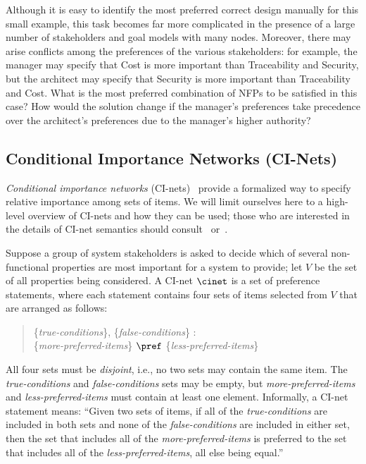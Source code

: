 Although it is easy to identify the most preferred correct design manually for this small example, this
task becomes far more complicated in the presence of a large number of stakeholders and goal models
with many nodes. Moreover, there may arise conflicts among the preferences of the various stakeholders: 
for example, the manager may specify that Cost is more important than Traceability and Security, but
the architect may specify that Security is more important than Traceability and Cost. What is the most
preferred combination of NFPs to be satisfied in this case? How would the solution change if the manager's 
preferences take precedence over the architect's preferences due to the manager's higher authority?


\subsection{Conditional Importance Networks (CI-Nets)}
\label{sec:cinet}

%
\emph{Conditional importance networks}
(CI-nets)~\cite{Bouveret:IJCAI2009} provide a formalized way to 
specify relative importance among sets of items. 
We will limit ourselves here to a high-level overview of CI-nets and
how they can be used; those who are interested in the details of 
CI-net semantics should consult~\cite{Bouveret:IJCAI2009} 
or~\cite{Santhanam:AAAI2010}. 

Suppose a group of system stakeholders is asked to decide which of
several non-functional properties are most important for a system to
provide; let $V$ be the set of all properties being considered. A
CI-net $\cinet$ is a set of preference statements, where each
statement contains four sets of items selected from $V$ that are 
arranged as follows: 
\begin{quote}
\{\emph{true-conditions}\}, \{\emph{false-conditions}\} : \\
\{\emph{more-preferred-items}\} $\pref$ \{\emph{less-preferred-items}\}
\end{quote}
All four sets must be \emph{disjoint}, i.e., no two sets may
contain the same item. The \emph{true-conditions} and
\emph{false-conditions} sets may be empty, but \emph{more-preferred-items}
and \emph{less-preferred-items} must contain at least one
element. Informally, a CI-net statement means: 
``Given two sets of items, if all of the \emph{true-conditions}
are included in both sets and none of the \emph{false-conditions} are
included in either set, then the set that includes all of the
\emph{more-preferred-items} is preferred to the set that includes all
of the \emph{less-preferred-items}, all else being equal.'' 

